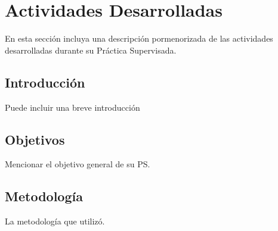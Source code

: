 \chapter{Actividades Desarrolladas}\label{cap:actividades}
En esta sección incluya una descripción pormenorizada de las actividades desarrolladas durante su Práctica Supervisada.

\section{Introducción}
Puede incluir una breve introducción

\section{Objetivos}
Mencionar el objetivo general de su PS.

\section{Metodología}
La metodología que utilizó.
